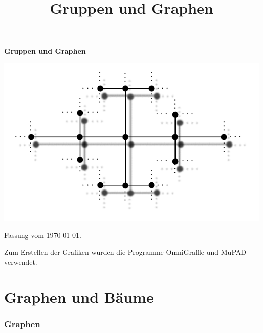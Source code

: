 \documentclass[a4paper, 12pt, twoside]{article}
\title{Gruppen und Graphen}
\date{}
\begin{document}
\thispagestyle{empty}
\begin{center}
\Huge \textbf{\textsf{Gruppen und Graphen}}
\end{center}
\vspace{2cm}
\begin{center}
	\includegraphics{grugraImages/titel}
\end{center}

\newpage

\renewcommand{\thepage}{\roman{page}} 

\newpage \thispagestyle{empty}
{\footnotesize
{}
Fassung vom \today.

Zum Erstellen der Grafiken wurden die Programme {\sf OmniGraffle} und
{\sf MuPAD} verwendet.
}
\cleardoublepage

\tableofcontents
\cleardoublepage

\setcounter{page}{1} %
\renewcommand{\thepage}{\arabic{page}} 

\cleardoublepage
\part{Graphen und Bäume}

\section{Graphen}\label{sec_graphen}
\end{document}
